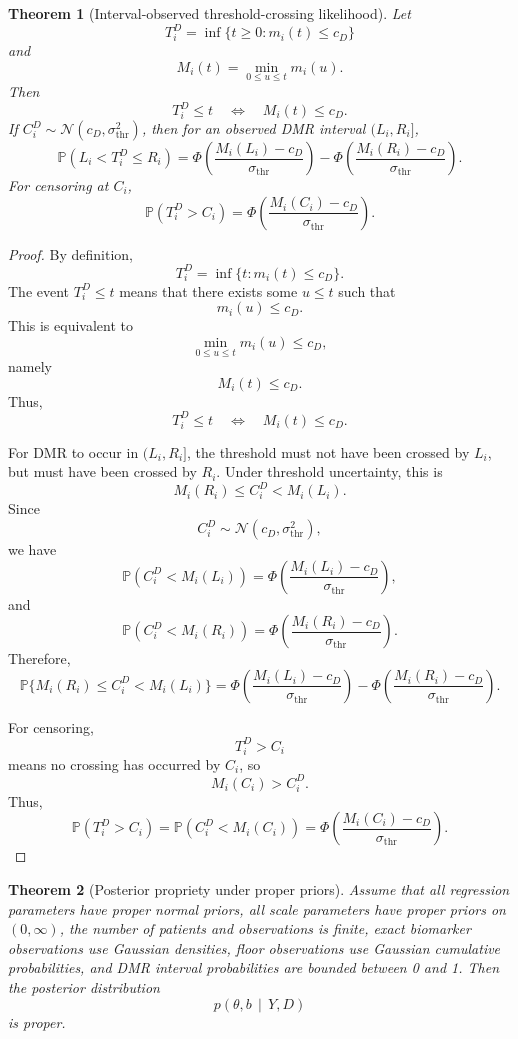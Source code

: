 \documentclass[11pt]{article}
\newtheorem{theorem}{Theorem}
\theoremstyle{remark}
\newcommand{\Normal}{\mathcal{N}}
\newcommand{\Prob}{\mathbb{P}}
\newcommand{\given}{\,\middle|\,}
\newcommand{\PhiStd}{\Phi}
\begin{document}
\begin{theorem}[Interval-observed threshold-crossing likelihood]
Let
\[
T_i^D=\inf\{t\geq 0:m_i(t)\leq c_D\}
\]
and
\[
M_i(t)=\min_{0\leq u\leq t}m_i(u).
\]
Then
\[
T_i^D\leq t
\quad\Longleftrightarrow\quad
M_i(t)\leq c_D.
\]
If \(C_i^D\sim \Normal(c_D,\sigma_{\mathrm{thr}}^2)\), then for an observed DMR interval \((L_i,R_i]\),
\[
\Prob(L_i<T_i^D\leq R_i)
=
\PhiStd
\left(
\frac{M_i(L_i)-c_D}{\sigma_{\mathrm{thr}}}
\right)
-
\PhiStd
\left(
\frac{M_i(R_i)-c_D}{\sigma_{\mathrm{thr}}}
\right).
\]
For censoring at \(C_i\),
\[
\Prob(T_i^D>C_i)
=
\PhiStd
\left(
\frac{M_i(C_i)-c_D}{\sigma_{\mathrm{thr}}}
\right).
\]
\end{theorem}

\begin{proof}
By definition,
\[
T_i^D=\inf\{t:m_i(t)\leq c_D\}.
\]
The event \(T_i^D\leq t\) means that there exists some \(u\leq t\) such that
\[
m_i(u)\leq c_D.
\]
This is equivalent to
\[
\min_{0\leq u\leq t}m_i(u)\leq c_D,
\]
namely
\[
M_i(t)\leq c_D.
\]
Thus,
\[
T_i^D\leq t
\quad\Longleftrightarrow\quad
M_i(t)\leq c_D.
\]

For DMR to occur in \((L_i,R_i]\), the threshold must not have been crossed by \(L_i\), but must have been crossed by \(R_i\). Under threshold uncertainty, this is
\[
M_i(R_i)\leq C_i^D<M_i(L_i).
\]
Since
\[
C_i^D\sim \Normal(c_D,\sigma_{\mathrm{thr}}^2),
\]
we have
\[
\Prob(C_i^D<M_i(L_i))
=
\PhiStd
\left(
\frac{M_i(L_i)-c_D}{\sigma_{\mathrm{thr}}}
\right),
\]
and
\[
\Prob(C_i^D<M_i(R_i))
=
\PhiStd
\left(
\frac{M_i(R_i)-c_D}{\sigma_{\mathrm{thr}}}
\right).
\]
Therefore,
\[
\Prob\{M_i(R_i)\leq C_i^D<M_i(L_i)\}
=
\PhiStd
\left(
\frac{M_i(L_i)-c_D}{\sigma_{\mathrm{thr}}}
\right)
-
\PhiStd
\left(
\frac{M_i(R_i)-c_D}{\sigma_{\mathrm{thr}}}
\right).
\]

For censoring,
\[
T_i^D>C_i
\]
means no crossing has occurred by \(C_i\), so
\[
M_i(C_i)>C_i^D.
\]
Thus,
\[
\Prob(T_i^D>C_i)
=
\Prob(C_i^D<M_i(C_i))
=
\PhiStd
\left(
\frac{M_i(C_i)-c_D}{\sigma_{\mathrm{thr}}}
\right).
\]
\end{proof}

\begin{theorem}[Posterior propriety under proper priors]
Assume that all regression parameters have proper normal priors, all scale parameters have proper priors on \((0,\infty)\), the number of patients and observations is finite, exact biomarker observations use Gaussian densities, floor observations use Gaussian cumulative probabilities, and DMR interval probabilities are bounded between 0 and 1. Then the posterior distribution
\[
p(\theta,b\given Y,D)
\]
is proper.
\end{theorem}
\end{document}
